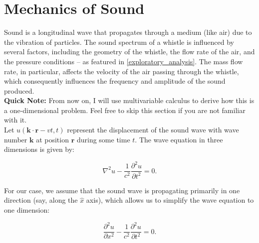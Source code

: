 
\section{Mechanics of Sound}
Sound is a longitudinal wave that propagates through a medium (like air) due to the vibration of particles.
The sound spectrum of a whistle is influenced by several factors, including the geometry of the whistle, the flow rate of the air, and 
the pressure conditions -- as featured in \ref{exploratory_analysis}. The mass flow rate, in particular, 
affects the velocity of the air passing through the whistle, which consequently influences the frequency and amplitude of the 
sound produced. \\

\textbf{Quick Note:} From now on, I will use multivariable calculus to derive how this is a one-dimensional problem. Feel free to skip this 
section if you are not familiar with it. \\

Let \(u(\mathbf{k}\cdot\mathbf{r} -vt, t)\) represent the displacement of the sound wave with wave number \(\mathbf{k}\) at 
position \(\mathbf{r}\) during some time \(t\). The wave equation in three dimensions is given by: 

\begin{equation}\label{wave_equation_3d_simple}
        \nabla^2 u - \frac{1}{c^2}\frac{\partial^2 u}{\partial t^2} = 0.
\end{equation}

For our case, we assume that the sound wave is propagating primarily in one direction (say, along the \(\hat{x}\) axis), which allows us to simplify 
the wave equation to one dimension:

\begin{equation}\label{wave_equation_1d_simple}
        \frac{\partial^2 u}{\partial x^2} - \frac{1}{c^2}\frac{\partial^2 u}{\partial t^2} = 0.
\end{equation}